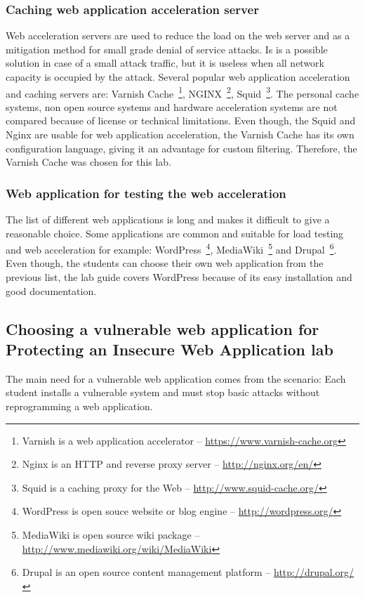 \subsubsection{Caching web application acceleration server}
Web acceleration servers are used to reduce the load on the web server and as a mitigation method for small grade denial of service attacks. Is is a possible solution in case of a small attack traffic, but it is useless when all network capacity is occupied by the attack. 
Several popular web application acceleration and caching servers are: Varnish Cache~\footnote{Varnish is a web application accelerator -- \url{https://www.varnish-cache.org}}, NGINX~\footnote{Nginx is an HTTP and reverse proxy server -- \url{http://nginx.org/en/}}, Squid~\footnote{Squid is a caching proxy for the Web -- \url{http://www.squid-cache.org/}}.
The personal cache systems, non open source systems and hardware acceleration systems are not compared because of license or technical limitations.
Even though, the Squid and Nginx are usable for web application acceleration, the Varnish Cache has its own configuration language, giving it an advantage for custom filtering. Therefore, the Varnish Cache was chosen for this lab.

\subsubsection{Web application for testing the web acceleration}
The list of different web applications is long and makes it difficult to give a reasonable choice.
Some applications are common and suitable for load testing and web acceleration for example: WordPress~\footnote{WordPress is open souce website or blog engine -- \url{http://wordpress.org/}}, MediaWiki~\footnote{MediaWiki is open source wiki package -- \url{http://www.mediawiki.org/wiki/MediaWiki}} and  Drupal~\footnote{Drupal is an open source content management platform -- \url{http://drupal.org/}}. Even though, the students can choose their own web application from the previous list, the lab guide covers WordPress because of its easy installation and good documentation.


\subsection{Choosing a vulnerable web application for Protecting an Insecure Web Application lab}

The main need for a vulnerable web application comes from the scenario: Each student installs a vulnerable system and must stop basic attacks without reprogramming a web application.

